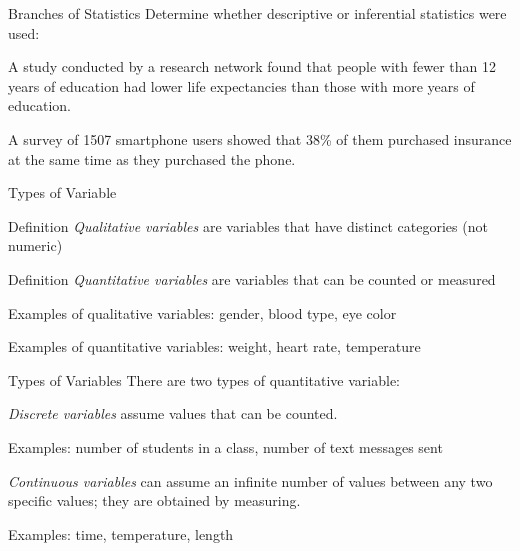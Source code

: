 \documentclass[t]{beamer}
\newcommand{\?}{\stackrel{?}{=}}
\begin{document}
	\begin{frame}{Branches of Statistics}
		Determine whether descriptive or inferential statistics were used:
		
		A study conducted by a research network found that people with fewer than 12 years of education had lower life expectancies than those with more years of education.
		
		
		A survey of 1507 smartphone users showed that 38\% of them purchased insurance at the same time as they purchased the phone.
		
	\end{frame}

	\begin{frame}{Types of Variable}
		\begin{block}{Definition}
			\textit{Qualitative variables} are variables that have distinct categories (not numeric)
		\end{block}
	
		\begin{block}{Definition}
			\textit{Quantitative variables} are variables that can be counted or measured
		\end{block} \pause
	
		Examples of qualitative variables: gender, blood type, eye color \pause
		
		Examples of quantitative variables: weight, heart rate, temperature
	\end{frame}

	\begin{frame}{Types of Variables}
		There are two types of quantitative variable: \pause
		
		\textit{Discrete variables} assume values that can be counted.
		
		Examples: number of students in a class, number of text messages sent \pause
		
		\textit{Continuous variables} can assume an infinite number of values between any two specific values; they are obtained by measuring.
		
		Examples: time, temperature, length
	\end{frame}
\end{document}

